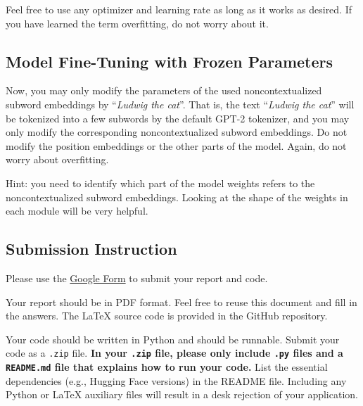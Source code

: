 \documentclass[12pt, letterpaper]{article}
\begin{document}
Feel free to use any optimizer and learning rate as long as it works as desired.
If you have learned the term overfitting, do not worry about it.

\subsection{Model Fine-Tuning with Frozen Parameters}
Now, you may only modify the parameters of the used noncontextualized subword embeddings by ``\textit{Ludwig the cat}''.
That is, the text ``\textit{Ludwig the cat}'' will be tokenized into a few subwords by the default GPT-2 tokenizer, and you may only modify the corresponding noncontextualized subword embeddings.
Do not modify the position embeddings or the other parts of the model.
Again, do not worry about overfitting.

Hint: you need to identify which part of the model weights refers to the noncontextualized subword embeddings.
Looking at the shape of the weights in each module will be very helpful.



\subsection*{Submission Instruction}
Please use the \href{https://forms.gle/Aj8ZS8mP6veCq3267}{Google Form} to submit your report and code.

Your report should be in PDF format.
Feel free to reuse this document and fill in the answers.
The \LaTeX\xspace source code is provided in the GitHub repository.

Your code should be written in Python and should be runnable.
Submit your code as a \texttt{.zip} file.
\textbf{In your \texttt{.zip} file, please only include \texttt{.py} files and a \texttt{README.md} file that explains how to run your code.}
List the essential dependencies (e.g., Hugging Face versions) in the README file.
Including any Python or \LaTeX\xspace auxiliary files will result in a desk rejection of your application.




\end{document}
